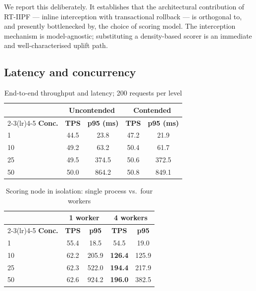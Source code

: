\documentclass[conference]{IEEEtran}
\begin{document}
We report this deliberately. It establishes that the architectural
contribution of RT-IIPF --- inline interception with transactional rollback
--- is orthogonal to, and presently bottlenecked by, the choice of scoring
model. The interception mechanism is model-agnostic; substituting a
density-based scorer is an immediate and well-characterised uplift path.

\subsection{Latency and concurrency}

\begin{table}[t]
\caption{End-to-end throughput and latency; 200 requests per level}
\label{tab:conc}
\centering
\begin{tabular}{lcccc}
\toprule
& \multicolumn{2}{c}{\textbf{Uncontended}} &
  \multicolumn{2}{c}{\textbf{Contended}} \\
\cmidrule(lr){2-3}\cmidrule(lr){4-5}
\textbf{Conc.} & \textbf{TPS} & \textbf{p95 (ms)} &
\textbf{TPS} & \textbf{p95 (ms)} \\
\midrule
1   & 44.5 & 23.8  & 47.2 & 21.9 \\
10  & 49.2 & 63.2  & 50.4 & 61.7 \\
25  & 49.5 & 374.5 & 50.6 & 372.5 \\
50  & 50.0 & 864.2 & 50.8 & 849.1 \\
\bottomrule
\end{tabular}
\end{table}

\begin{table}[t]
\caption{Scoring node in isolation: single process vs.\ four workers}
\label{tab:scale}
\centering
\begin{tabular}{lcccc}
\toprule
& \multicolumn{2}{c}{\textbf{1 worker}} &
  \multicolumn{2}{c}{\textbf{4 workers}} \\
\cmidrule(lr){2-3}\cmidrule(lr){4-5}
\textbf{Conc.} & \textbf{TPS} & \textbf{p95} & \textbf{TPS} &
\textbf{p95} \\
\midrule
1   & 55.4 & 18.5  & 54.5 & 19.0  \\
10  & 62.2 & 205.9 & \textbf{126.4} & 125.9 \\
25  & 62.3 & 522.0 & \textbf{194.4} & 217.9 \\
50  & 62.6 & 924.2 & \textbf{196.0} & 382.5 \\
\bottomrule
\end{tabular}
\end{table}
\end{document}

